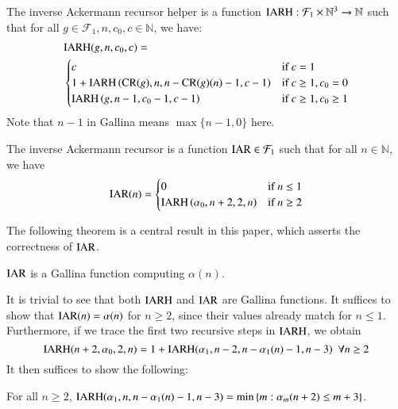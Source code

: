 \begin{defn}  \label{defn: inv_ack_recursor_helper}
The inverse Ackermann recursor helper is a function $\text{IARH} : \mathcal{F}_1\times \mathbb{N}^3 \to \mathbb{N}$ such that for all $g\in \mathcal{F}_1, n, c_0, c\in \mathbb{N}$, we have:
\begin{equation}
\begin{aligned}
& \text{IARH}(g, n, c_0, c) =  \\
& \begin{cases}
c & \text{if } c = 1 \\
1 + \text{IARH}\left(\text{CR}(g), n, n - \text{CR}(g)(n) - 1, c - 1\right) & \text{if } c \ge 1, c_0 = 0 \\
\text{IARH}\left(g, n - 1, c_0 - 1, c - 1\right) & \text{if } c \ge 1, c_0 \ge 1
\end{cases}
\end{aligned}
\end{equation}
Note that $n - 1$ in Gallina means $\max\{n-1, 0\}$ here.
\end{defn}

\begin{defn}  \label{defn: inv_ack_recursor}
The inverse Ackermann recursor is a function $\text{IAR} \in \mathcal{F}_1$ such that for all $n\in \mathbb{N}$, we have
\begin{equation}
\text{IAR}(n) = \begin{cases}
0 & \text{if } n \le 1 \\ \text{IARH}\left(\alpha_0, n + 2, 2, n\right) & \text{if } n\ge 2
\end{cases}
\end{equation}
\end{defn}

The following theorem is a central result in this paper, which asserts the correctness of $\text{IAR}$.

\begin{thm} \label{thm: inv_ack_correct}
$\text{IAR}$ is a Gallina function computing $\alpha(n)$.
\end{thm}

It is trivial to see that both $\text{IARH}$ and $\text{IAR}$ are Gallina functions. It suffices to show that $\text{IAR}(n) = \alpha(n)$ for $n\ge 2$, since their values already match for $n\le 1$. Furthermore, if we trace the first two recursive steps in $\text{IARH}$, we obtain
\begin{equation}
\text{IARH}(n+2, \alpha_0, 2, n) = 1 + \text{IARH}(\alpha_1, n-2, n-\alpha_1(n)-1, n-3) \ \ \forall n\ge 2
\end{equation}
It then suffices to show the following:

\begin{lem}
For all $n\ge 2$, $\text{IARH}(\alpha_1, n, n - \alpha_1(n) - 1, n - 3) = \min\left\{m : \alpha_m(n+2)\le m+3 \right\}$.
\end{lem}